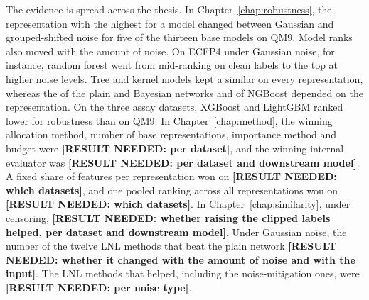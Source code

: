 The evidence is spread across the thesis. In Chapter~\ref{chap:robustness}, the representation with the highest \aucnorm{} for a model changed between Gaussian and grouped-shifted noise for five of the thirteen base models on QM9. Model ranks also moved with the amount of noise. On ECFP4 under Gaussian noise, for instance, random forest went from mid-ranking on clean labels to the top at higher noise levels. Tree and kernel models kept a similar \aucnorm{} on every representation, whereas the \aucnorm{} of the plain and Bayesian networks and of NGBoost depended on the representation. On the three assay datasets, XGBoost and LightGBM ranked lower for robustness than on QM9. In Chapter~\ref{chap:method}, the winning allocation method, number of base representations, importance method and budget were \textbf{[RESULT NEEDED: per dataset]}, and the winning internal evaluator was \textbf{[RESULT NEEDED: per dataset and downstream model]}. A fixed share of features per representation won on \textbf{[RESULT NEEDED: which datasets]}, and one pooled ranking across all representations won on \textbf{[RESULT NEEDED: which datasets]}. In Chapter~\ref{chap:similarity}, under censoring, \textbf{[RESULT NEEDED: whether raising the clipped labels helped, per dataset and downstream model]}. Under Gaussian noise, the number of the twelve LNL methods that beat the plain network \textbf{[RESULT NEEDED: whether it changed with the amount of noise and with the input]}. The LNL methods that helped, including the noise-mitigation ones, were \textbf{[RESULT NEEDED: per noise type]}.

